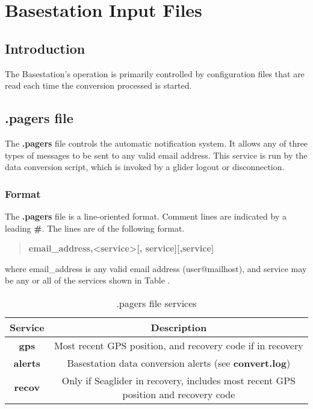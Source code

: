 \documentclass[12pt,english,twoside]{book}
\providecommand{\tabularnewline}{\\}
\begin{document}
\chapter{Basestation Input Files}

\section{Introduction}
The Basestation's operation is primarily controlled by configuration files that
are read each time the conversion processed is started.  

\section{.pagers file}

The \textbf{.pagers} file controls the automatic notification system.
It allows any of three types of messages to be sent to any valid email
address. This service is run by the data conversion script, which
is invoked by a glider logout or disconnection.

\subsection{Format}

The \textbf{.pagers} file is a line-oriented format. Comment lines
are indicated by a leading \textbf{\#}. The lines are of the following
format.

\begin{quote}
\textbf{email\_address,<service>{[}, service]{[},service] }
\end{quote}
where email\_address is any valid email address (user@mailhost), and
service may be any or all of the services shown in Table .

%
\begin{table}[H]

\caption{.pagers file services}

\begin{tabular}{|c|c|}
\hline 
\textbf{Service}&
\textbf{Description}\tabularnewline
\hline
\hline 
\textbf{gps}&
Most recent GPS position, and recovery code if in recovery\tabularnewline
\hline 
\textbf{alerts}&
Basestation data conversion alerts (see \textbf{convert.log})\tabularnewline
\hline 
\textbf{recov}&
Only if Seaglider in recovery, includes most recent GPS position and
recovery code\tabularnewline
\hline
\end{tabular}
\end{table}
\end{document}
